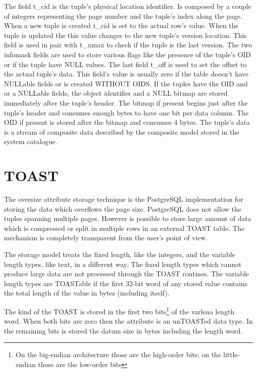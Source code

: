 The field t\_cid is the tuple's physical location identifier. Is composed by a couple of 
integers representing the page number and the tuple's index along the page. When a new tuple is created 
t\_cid is set to the actual row's value. When the tuple is updated the this 
value changes to the new tuple's version location. This field is used in pair with t\_xmax to check if 
the tuple is the last version. The two infomask fields are used to store various flags like the presence of 
the tuple's OID or if the tuple have NULL values. The last field t\_off is used to set the offset to the 
actual tuple's data. This field's value is usually zero if the table doesn't have NULLable fields or is 
created WITHOUT OIDS. If the tuples have the OID and or a NULLable fields, the object identifier and 
a NULL bitmap are stored immediately after the tuple's header. The bitmap if present begins just after the 
tuple's header and consumes enough bytes to have one bit per data column. The OID if present is stored 
after the bitmap and consumes 4 bytes. The tuple's data is a stream of composite data described by the 
composite model stored in the system catalogue. 


\section{TOAST}
\label{sec:TOAST}
The oversize attribute storage technique is the PostgreSQL implementation for storing the data 
which overflows the page size. PostgreSQL does not allow the tuples spanning multiple pages. However is 
possible to store large amount of data which is compressed or split in multiple rows in an external 
TOAST table. The mechanism is completely transparent from the user's point of view.\newline

The storage model treats the fixed length, like the integers, and the variable length types, like text, in 
a different way. The fixed length types which cannot produce large data are not processed through the TOAST 
routines. The variable length types are TOASTable if the first 32-bit word of any stored value contains the 
total length of the value in bytes (including itself).

The kind of the TOAST is stored in the first two bits\footnote{On the big-endian architecture those are the 
high-order bits; on the little-endian those are the low-order bits} of the varlena length 
word. When both bits are zero then the attribute is an unTOASTed data type. In the remaining bits is stored 
the datum size in bytes including the length word.\newline

